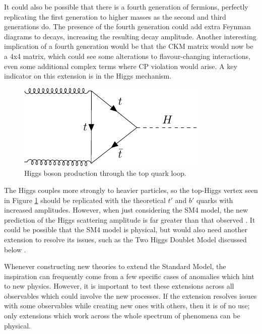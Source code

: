 \documentclass[a4paper,12pt]{article}
\begin{document}
It could also be possible that there is a fourth generation of fermions, perfectly replicating the first generation to higher masses as the second and third generations do. 
The presence of the fourth generation could add extra Feynman diagrams to decays, increasing the resulting decay amplitude. 
Another interesting implication of a fourth generation would be that the CKM matrix would now be a 4x4 matrix, which could see some alterations to flavour-changing interactions, even some additional complex terms where CP violation would arise. 
A key indicator on this extension is in the Higgs mechanism. 
\begin{figure}[H]
    \centering
    \includegraphics{../notes/higgs.pdf}
    \caption{\label{fig:higgs} Higgs boson production through the top quark loop.}
\end{figure}
The Higgs couples more strongly to heavier particles, so the top-Higgs vertex seen in Figure \ref{fig:higgs} should be replicated with the theoretical $t'$ and $b'$ quarks with increased amplitudes. 
However, when just considering the SM4 model, the new prediction of the Higgs scattering amplitude is far greater than that observed \cite{sm4}. 
It could be possible that the SM4 model is physical, but would also need another extension to resolve its issues, such as the Two Higgs Doublet Model discussed below \cite{shal}. 

Whenever constructing new theories to extend the Standard Model, the inspiration can frequently come from a few specific cases of anomalies which hint to new physics. 
However, it is important to test these extensions across all observables which could involve the new processes.
If the extension resolves issues with some observables while creating new ones with others, then it is of no use; only extensions which work across the whole spectrum of phenomena can be physical. 
\end{document}
